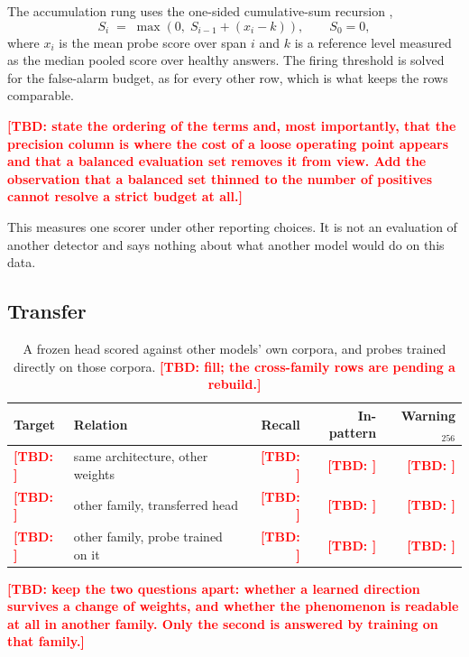 \documentclass{article}
\newcommand{\TBD}[1]{\textcolor{red}{\textbf{[TBD: #1]}}}
\begin{document}
The accumulation rung uses the one-sided cumulative-sum recursion
\citep{page1954continuous},
\begin{equation}
  S_i \;=\; \max\!\left(0,\; S_{i-1} + (x_i - k)\right),\qquad S_0 = 0,
\end{equation}
where $x_i$ is the mean probe score over span $i$ and $k$ is a reference level
measured as the median pooled score over healthy answers. The firing threshold is
solved for the false-alarm budget, as for every other row, which is what keeps
the rows comparable.

\TBD{state the ordering of the terms and, most importantly, that the precision
column is where the cost of a loose operating point appears and that a balanced
evaluation set removes it from view. Add the observation that a balanced set
thinned to the number of positives cannot resolve a strict budget at all.}

This measures one scorer under other reporting choices. It is not an evaluation
of another detector and says nothing about what another model would do on this
data.

\subsection{Transfer}
\label{sec:exp-transfer}

\begin{table}[t]
  \caption{A frozen head scored against other models' own corpora, and probes
  trained directly on those corpora. \TBD{fill; the cross-family rows are
  pending a rebuild.}}
  \label{tab:transfer}
  \centering
  \small
  \begin{tabular}{llrrr}
    \toprule
    Target & Relation & Recall & In-pattern & Warning$_{256}$ \\
    \midrule
    \TBD{} & same architecture, other weights & \TBD{} & \TBD{} & \TBD{} \\
    \TBD{} & other family, transferred head   & \TBD{} & \TBD{} & \TBD{} \\
    \TBD{} & other family, probe trained on it & \TBD{} & \TBD{} & \TBD{} \\
    \bottomrule
  \end{tabular}
\end{table}

\TBD{keep the two questions apart: whether a learned direction survives a change
of weights, and whether the phenomenon is readable at all in another family. Only
the second is answered by training on that family.}
\end{document}
